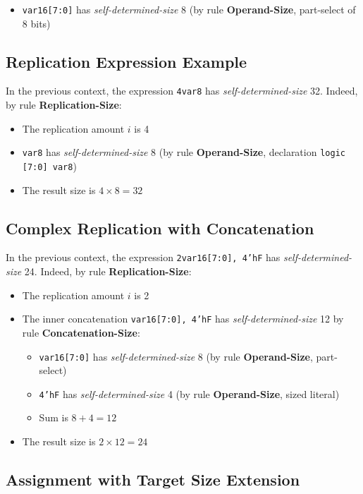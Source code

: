 \documentclass{article}
\newcommand{\sv}[1]{\texttt{#1}}
\newcommand{\sds}{\emph{self-determined-size}}
\begin{document}
\begin{itemize}
  \item \sv{var16[7:0]} has \sds{} 8 (by rule
    \textbf{Operand-Size}, part-select of 8 bits)
\end{itemize}

\subsection{Replication Expression Example}

In the previous context, the expression \sv{{4{var8}}} has
\sds{} 32. Indeed, by rule \textbf{Replication-Size}:

\begin{itemize}
  \item The replication amount $i$ is 4
  \item \sv{var8} has \sds{} 8 (by rule
    \textbf{Operand-Size}, declaration \sv{logic [7:0] var8})
  \item The result size is $4 \times 8 = 32$
\end{itemize}

\subsection{Complex Replication with Concatenation}

In the previous context, the expression \sv{{2{var16[7:0], 4'hF}}} has
\sds{} 24. Indeed, by rule \textbf{Replication-Size}:

\begin{itemize}
  \item The replication amount $i$ is 2
  \item The inner concatenation \sv{{var16[7:0], 4'hF}} has
    \sds{} 12 by rule \textbf{Concatenation-Size}:
    \begin{itemize}
      \item \sv{var16[7:0]} has \sds{} 8 (by rule
        \textbf{Operand-Size}, part-select)
      \item \sv{4'hF} has \sds{} 4 (by rule
        \textbf{Operand-Size}, sized literal)
      \item Sum is $8 + 4 = 12$
    \end{itemize}
  \item The result size is $2 \times 12 = 24$
\end{itemize}

\subsection{Assignment with Target Size Extension}
\end{document}
